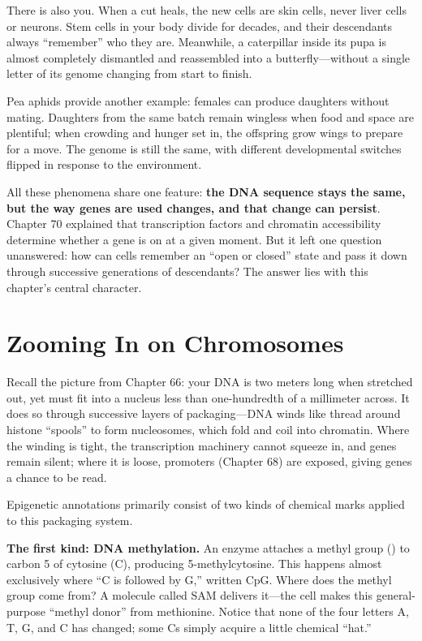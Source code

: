 There is also you. When a cut heals, the new cells are skin cells, never liver cells or neurons. Stem cells in your body divide for decades, and their descendants always ``remember'' who they are. Meanwhile, a caterpillar inside its pupa is almost completely dismantled and reassembled into a butterfly---without a single letter of its genome changing from start to finish.

Pea aphids provide another example: females can produce daughters without mating. Daughters from the same batch remain wingless when food and space are plentiful; when crowding and hunger set in, the offspring grow wings to prepare for a move. The genome is still the same, with different developmental switches flipped in response to the environment.

All these phenomena share one feature: \textbf{the DNA sequence stays the same, but the way genes are used changes, and that change can persist}. Chapter 70 explained that transcription factors and chromatin accessibility determine whether a gene is on at a given moment. But it left one question unanswered: how can cells remember an ``open or closed'' state and pass it down through successive generations of descendants? The answer lies with this chapter's central character.

\section{Zooming In on Chromosomes}

Recall the picture from Chapter 66: your DNA is two meters long when stretched out, yet must fit into a nucleus less than one-hundredth of a millimeter across. It does so through successive layers of packaging---DNA winds like thread around histone ``spools'' to form nucleosomes, which fold and coil into chromatin. Where the winding is tight, the transcription machinery cannot squeeze in, and genes remain silent; where it is loose, promoters (Chapter 68) are exposed, giving genes a chance to be read.

Epigenetic annotations primarily consist of two kinds of chemical marks applied to this packaging system.

\textbf{The first kind: DNA methylation.} An enzyme attaches a methyl group () to carbon 5 of cytosine (C), producing 5-methylcytosine. This happens almost exclusively where ``C is followed by G,'' written CpG. Where does the methyl group come from? A molecule called SAM delivers it---the cell makes this general-purpose ``methyl donor'' from methionine. Notice that none of the four letters A, T, G, and C has changed; some Cs simply acquire a little chemical ``hat.''

